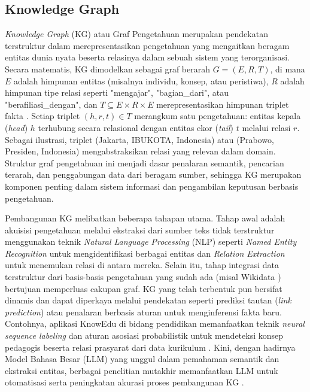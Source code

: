 \subsection{Knowledge Graph}
	\begin{subsectcontent}
		\indent \textit{Knowledge Graph} (KG) atau Graf Pengetahuan merupakan pendekatan terstruktur dalam merepresentasikan pengetahuan yang mengaitkan beragam entitas dunia nyata beserta relasinya dalam sebuah sistem yang terorganisasi. Secara matematis, KG dimodelkan sebagai graf berarah $G = (E, R, T)$, di mana $E$ adalah himpunan entitas (misalnya individu, konsep, atau peristiwa), $R$ adalah himpunan tipe relasi seperti "mengajar", "bagian\_dari", atau "berafiliasi\_dengan", dan $T \subseteq E \times R \times E$ merepresentasikan himpunan triplet fakta \cite{Hogan_2021}. Setiap triplet $(h, r, t) \in T$ merangkum satu pengetahuan: entitas kepala (\textit{head}) $h$ terhubung secara relasional dengan entitas ekor (\textit{tail}) $t$ melalui relasi $r$. Sebagai ilustrasi, triplet (Jakarta, IBUKOTA, Indonesia) atau (Prabowo, Presiden, Indonesia) mengabstraksikan relasi yang relevan dalam domain. Struktur graf pengetahuan ini menjadi dasar penalaran semantik, pencarian terarah, dan penggabungan data dari beragam sumber, sehingga KG merupakan komponen penting dalam sistem informasi dan pengambilan keputusan berbasis pengetahuan.
		
		Pembangunan KG melibatkan beberapa tahapan utama. Tahap awal adalah akuisisi pengetahuan melalui ekstraksi dari sumber teks tidak terstruktur menggunakan teknik \textit{Natural Language Processing} (NLP) seperti \textit{Named Entity Recognition} untuk mengidentifikasi berbagai entitas dan \textit{Relation Extraction} untuk menemukan relasi di antara mereka. Selain itu, tahap integrasi data terstruktur dari basis-basis pengetahuan yang sudah ada (misal Wikidata \cite{wikidata}) bertujuan memperluas cakupan graf. KG yang telah terbentuk pun bersifat dinamis dan dapat diperkaya melalui pendekatan seperti prediksi tautan (\textit{link prediction}) atau penalaran berbasis aturan untuk menginferensi fakta baru. Contohnya, aplikasi KnowEdu di bidang pendidikan memanfaatkan teknik \textit{neural sequence labeling} dan aturan asosiasi probabilistik untuk mendeteksi konsep pedagogis beserta relasi prasyarat dari data kurikulum \cite{knowedu}. Kini, dengan hadirnya Model Bahasa Besar (LLM) yang unggul dalam pemahaman semantik dan ekstraksi entitas, berbagai penelitian mutakhir memanfaatkan LLM untuk otomatisasi serta peningkatan akurasi proses pembangunan KG \cite{edge2025localglobalgraphrag}.
		

\end{subsectcontent}
